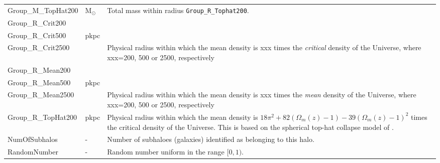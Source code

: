 \begin{table*}
\begin{center}
\begin{tabular}{ >{\ttfamily}p{4cm}p{1.5cm}p{11cm}}
Group\_M\_TopHat200 &
M$_{\odot}$ &
Total mass within radius {\tt Group\_R\_Tophat200}. \\

Group\_R\_Crit200 \\
Group\_R\_Crit500 & pkpc \\
Group\_R\_Crit2500 & & \multirow{-3}{11cm}{Physical radius within which the mean density is xxx times the \emph{critical} density of the Universe, where xxx=200, 500 or 2500, respectively}.\\

Group\_R\_Mean200\\
Group\_R\_Mean500 & pkpc \\
Group\_R\_Mean2500 & & \multirow{-3}{11cm}{Physical radius within which the mean density is xxx times the \emph{mean} density of the Universe, where xxx=200, 500 or 2500, respectively}.\\

Group\_R\_TopHat200 &
pkpc &
Physical radius within which the mean density is $18\pi^{2} + 82
(\Omega_{m}(z)-1)-39 (\Omega_{m}(z)-1)^{2}$ times the critical density of the Universe. This is based on 
the spherical top-hat collapse model of \citep{Bryan1998}.\\

NumOfSubhalos &
- &
Number of subhaloes (galaxies) identified as belonging to this halo. \\

RandomNumber &
- &
Random number uniform in the range $[0,1)$. \\
\hline
\end{tabular}
\end{center}
\end{table*}


